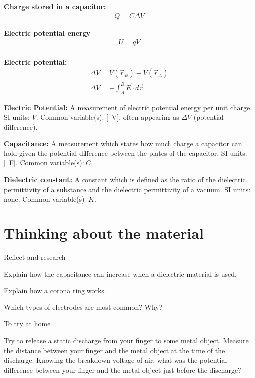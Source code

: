 \newpage
\begin{importantEquations}
\medskip
\begin{multicols}{2}
\textbf{Charge stored in a capacitor:}
\begin{align*}
Q = C\Delta V
\end{align*}

\textbf{Electric potential energy}
\begin{align*}
U=qV
\end{align*}
\columnbreak
\\
\textbf{Electric potential:}
\begin{align*}
\Delta V = V(\vec r_B)-V(\vec r_A)\\
\Delta V = -\int_{A}^{B}\vec E \cdot d\vec r
\end{align*}
\medskip
\end{multicols}
\end{importantEquations}

\begin{definitions}
	\textbf{Electric Potential:} A measurement of electric potential energy per unit charge. SI units: $V$. Common variable(s): [\SI{}{V}], often appearing as $\Delta V$ (potential difference).
	\medskip
	\item \textbf{Capacitance:} A measurement which states how much charge a capacitor can hold given the potential difference between the plates of the capacitor. SI units: [\SI{}{F}]. Common variable(s): $C$.
	\medskip
	\item \textbf{Dielectric constant:} A constant which is defined as the ratio of the dielectric permittivity of a substance and the dielectric permittivity of a vacuum. SI units: none. Common variable(s): $K$.
\end{definitions}

\newpage
\section{Thinking about the material}

\begin{chapteractivity}{Reflect and research}
{
\item Explain how the capacitance can increase when a dielectric material is used.
\item Explain how a corona ring works.
\item Which types of electrodes are most common? Why?
}
\end{chapteractivity}

\begin{chapteractivity}{To try at home}
{
\item Try to release a static discharge from your finger to some metal object. Measure the distance between your finger and the metal object at the time of the discharge. Knowing the breakdown voltage of air, what was the potential difference between your finger and the metal object just before the discharge?
}
\end{chapteractivity}

